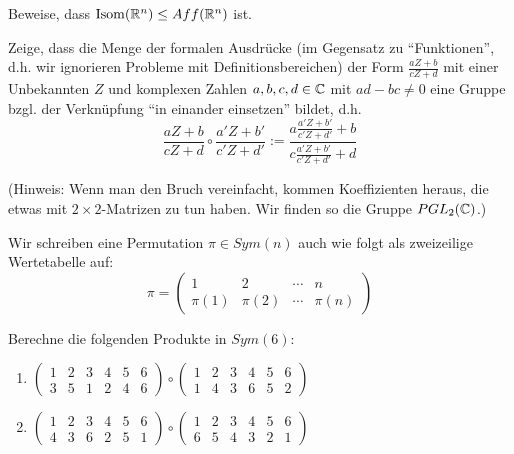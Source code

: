 \begin{sheet}
\begin{problem}[title={Automorphismen des affinen Raums}]
\begin{subproblem}
Beweise, dass $\operatorname{Isom}(\mathbb{R}^n)\leq Aff(\mathbb{R}^n)$ ist.
\end{subproblem}
\end{problem}

\begin{problem}[title={Möbius-Transformationen / Automorphismen der projektiven Geraden}]
Zeige, dass die Menge der formalen Ausdrücke (im Gegensatz zu \enquote{Funktionen}, d.h. wir ignorieren Probleme mit Definitionsbereichen) der Form $\frac{aZ+b}{cZ+d}$ mit einer Unbekannten $Z$ und komplexen Zahlen $a,b,c,d\in\mathbb{C}$ mit $ad-bc\neq 0$ eine Gruppe bzgl. der Verknüpfung \enquote{in einander einsetzen} bildet, d.h.
\[\frac{aZ+b}{cZ+d} \circ \frac{a'Z+b'}{c'Z+d'} := \frac{a\frac{a'Z+b'}{c'Z+d'}+b}{c\frac{a'Z+b'}{c'Z+d'}+d}\]

(Hinweis: Wenn man den Bruch vereinfacht, kommen Koeffizienten heraus, die etwas mit $2\times 2$-Matrizen zu tun haben. Wir finden so die Gruppe $PGL_2(\mathbb{C})$.)
\end{problem}



\begin{problem}
Wir schreiben eine Permutation $\pi\in Sym(n)$ auch wie folgt als zweizeilige Wertetabelle auf:
\[\pi = \begin{pmatrix} 1& 2 & \cdots & n \\ \pi(1) & \pi(2) & \cdots & \pi(n)\end{pmatrix}\]

Berechne die folgenden Produkte in $Sym(6)$:
\begin{enumerate}
\item $\begin{pmatrix} 1 & 2 & 3 & 4 & 5 & 6 \\ 3 & 5 & 1 & 2 & 4 & 6\end{pmatrix} \circ \begin{pmatrix} 1 & 2 & 3 & 4 & 5 & 6 \\ 1 & 4 & 3 & 6 & 5 & 2\end{pmatrix}$
\item $\begin{pmatrix} 1 & 2 & 3 & 4 & 5 & 6 \\ 4 & 3 & 6 & 2 & 5 & 1\end{pmatrix} \circ \begin{pmatrix} 1 & 2 & 3 & 4 & 5 & 6 \\ 6 & 5 & 4 & 3 & 2 & 1\end{pmatrix}$
\end{enumerate}
\end{problem}


\end{sheet}
